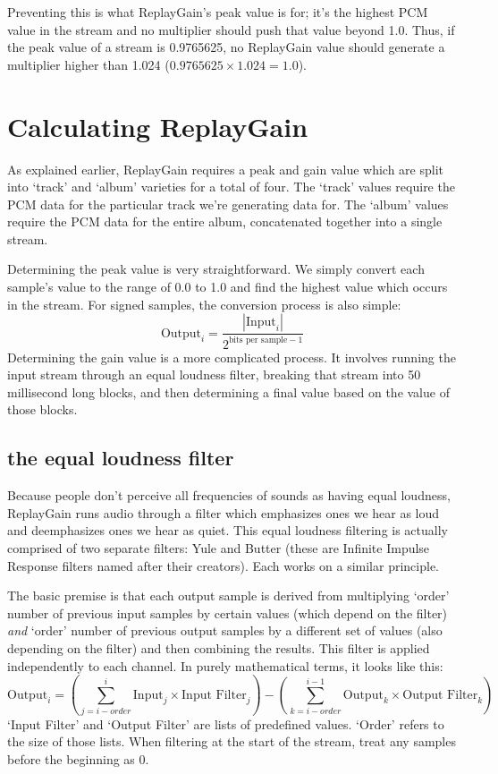 Preventing this is what ReplayGain's peak value is for;
it's the highest PCM value in the stream and no multiplier should push
that value beyond 1.0.
Thus, if the peak value of a stream is 0.9765625, no ReplayGain value
should generate a multiplier higher than 1.024
($0.9765625 \times 1.024 = 1.0$).

\section{Calculating ReplayGain}

As explained earlier, ReplayGain requires a peak and gain value
which are split into `track' and `album' varieties for a total of four.
The `track' values require the PCM data for the particular track
we're generating data for.
The `album' values require the PCM data for the entire album,
concatenated together into a single stream.

Determining the peak value is very straightforward.
We simply convert each sample's value to the range of 0.0 to 1.0
and find the highest value which occurs in the stream.
For signed samples, the conversion process is also simple:
\begin{equation}
\text{Output}_i = \frac{| \text{Input}_i |}{2 ^ {\text{bits per sample} - 1}}
\end{equation}
Determining the gain value is a more complicated process.
It involves running the input stream through an equal loudness filter,
breaking that stream into 50 millisecond long blocks, and then
determining a final value based on the value of those blocks.

\subsection{the equal loudness filter}
Because people don't perceive all frequencies of sounds as having
equal loudness, ReplayGain runs audio through a filter which
emphasizes ones we hear as loud and deemphasizes ones we hear as quiet.
This equal loudness filtering is actually comprised of two separate
filters: Yule and Butter (these are Infinite Impulse Response filters
named after their creators).
Each works on a similar principle.

The basic premise is that each output sample is derived from multiplying
`order' number of previous input samples by certain values (which
depend on the filter) \textit{and} `order' number of previous output
samples by a different set of values (also depending on the filter)
and then combining the results.
This filter is applied independently to each channel.
In purely mathematical terms, it looks like this:
\begin{equation}
\text{Output}_i =
\left ( \overset{i}{\underset{j = i - order}{\sum}}
\text{Input}_j \times {\text{Input Filter}_j} \right )
-
\left ( \overset{i - 1}{\underset{k = i - order}{\sum}}
\text{Output}_k \times {\text{Output Filter}_k} \right )
\end{equation}
`Input Filter' and `Output Filter' are lists of predefined values.
`Order' refers to the size of those lists.
When filtering at the start of the stream, treat any samples
before the beginning as 0.

